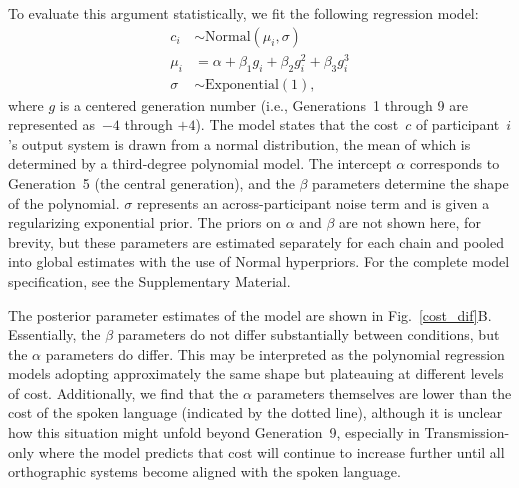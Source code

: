 \documentclass[doc,biblatex]{apa7}
\begin{document}
To evaluate this argument statistically, we fit the following regression model:
	\begin{equation}
	\begin{aligned}
	   c_i & \sim \mathrm{Normal}(\mu_i, \sigma) \\
	 \mu_i & =    \alpha + \beta_1 g_i + \beta_2 g_i^2 + \beta_3 g_i^3 \\
	\sigma & \sim \mathrm{Exponential}(1),
	\end{aligned}
	\end{equation}
where $g$ is a centered generation number (i.e., Generations~1 through 9 are represented as~$-4$ through $+4$). The model states that the cost~$c$ of participant~$i$'s output system is drawn from a normal distribution, the mean of which is determined by a third-degree polynomial model. The intercept $\alpha$ corresponds to Generation~5 (the central generation), and the $\beta$ parameters determine the shape of the polynomial. $\sigma$ represents an across-participant noise term and is given a regularizing exponential prior. The priors on $\alpha$ and $\beta$ are not shown here, for brevity, but these parameters are estimated separately for each chain and pooled into global estimates with the use of Normal hyperpriors. For the complete model specification, see the Supplementary Material.

The posterior parameter estimates of the model are shown in Fig.~\ref{cost_dif}B. Essentially, the $\beta$ parameters do not differ substantially between conditions, but the $\alpha$ parameters do differ. This may be interpreted as the polynomial regression models adopting approximately the same shape but plateauing at different levels of cost. Additionally, we find that the $\alpha$ parameters themselves are lower than the cost of the spoken language (indicated by the dotted line), although it is unclear how this situation might unfold beyond Generation~9, especially in Transmission-only where the model predicts that cost will continue to increase further until all orthographic systems become aligned with the spoken language.
\end{document}

